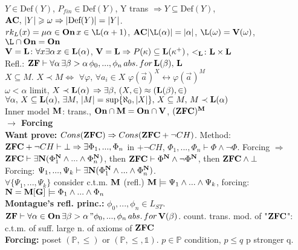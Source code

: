 \documentclass[9pt]{article}
\newcommand{\class}[1]{{\bf #1}}
\newcommand{\Pp}{\mathbb{P}}
\newcommand{\mytitle}[1]{ {\bf $\rightarrow$ #1}\\}
\newcommand{\On}{\class{On}}
\newcommand{\V}{\class{V}}
\newcommand{\Ll}{\class{L}}
\newcommand{\Def}{\mbox{Def}}
\begin{document}
\begin{multicols*}{2}
$Y\in\Def(Y)$, $P_{fin}\in\Def(Y)$, Y trans $\Rightarrow Y\subseteq \Def(Y)$, $\class{AC},\,|Y|\geqslant\omega\Rightarrow|\Def(Y)|=|Y|$.\\
$rk_L(x)=\mu\alpha\in\On\,x\in \L(\alpha+1)$, $\class{AC} |\L(\alpha)|=|\alpha|$, $\L(\omega)=\V(\omega)$, $\L\cap\On=\On$\\
$\V=\class{L}\colon \forall x\exists \alpha\,x\in\class{L}(\alpha)$, $\V=\Ll\Rightarrow P(\kappa)\subseteq\Ll(\kappa^+)$, $<_\Ll\colon \Ll\times\Ll$\\
Refl.: $\class{ZF}\vdash \forall\alpha\,\exists\beta>\alpha\,\phi_0,...,\phi_n\,abs.\,for\, \class{L}(\beta),\,\class{L}$\\
$X\subseteq M$. $X\prec M\Leftrightarrow$ $\forall \varphi,\,\forall a_i\in X$ $\varphi(\vec{a})^X\leftrightarrow\varphi(\vec{a})^M$\\
$\omega<\alpha$ limit, $X\prec\Ll(\alpha)$ $\Rightarrow\exists \beta,\,(X,\in)\approx(\Ll(\beta),\in)$\\
$\forall\alpha,\,X\subseteq \Ll(\alpha),\,\exists M,\,|M|=\sup\{\aleph_0,|X|\},\,X\subseteq M,\,M\prec\Ll(\alpha)$\\
Inner model $\class{M}$: trans., $\class{On}\cap\class{M}=\class{On}\cap\V$, $(\class{ZFC})^\class{M}$\\
\mytitle{Forcing}
{\bf Want prove:} $Cons(\class{ZFC})\Rightarrow Cons(\class{ZFC}+\neg CH)$.
Method: $\class{ZFC}+\neg CH\vdash\bot\Rightarrow\exists \Phi_1,...,\Phi_n$ in $+\neg CH$, $\Phi_1,...,\Phi_n\vdash \Phi \wedge\neg\Phi$.
Forcing $\Rightarrow$ $\class{ZFC}\vdash\exists\class{N}(\Phi_1^\class{N}\wedge...\wedge\Phi_n^\class{N})$, then $\class{ZFC}\vdash \Phi^\class{N}\wedge\neg\Phi^\class{N}$, then $\class{ZFC}\wedge\bot$\\
Forcing: $\Psi_1,...,\Psi_k\vdash \exists\class{N}(\Phi_1^\class{N}\wedge...\wedge\Phi_n^\class{N})$.\\
$\forall \{\Psi_1,...,\Psi_k\}$ consider c.t.m. $\class{M}$ (refl.) $\class{M}\models \Psi_1\wedge...\wedge\Psi_k$, forcing: $\class{N}=\class{M}[\class{G}]\models\Phi_1\wedge...\wedge\Phi_n$\\
{\bf Montague's refl. princ.:} $\phi_0,...,\phi_n\in L_{ST}$. $\class{ZF}\vdash \forall\alpha\in\On\,\exists\beta>\alpha \,"\phi_0,...,\phi_n\,abs.\,for\,\V(\beta)$. count. trans. mod. of "$\class{ZFC}$": c.t.m. of suff. large n. of axioms of $\class{ZFC}$\\
{\bf Forcing:} poset $(\mathbb{P}, \leqslant)$ or $(\mathbb{P}, \leqslant,\mathbb{1})$. $p\in \Pp$ condition, $p\leqslant q$ p stronger q.\\

\end{multicols*}
\end{document}
